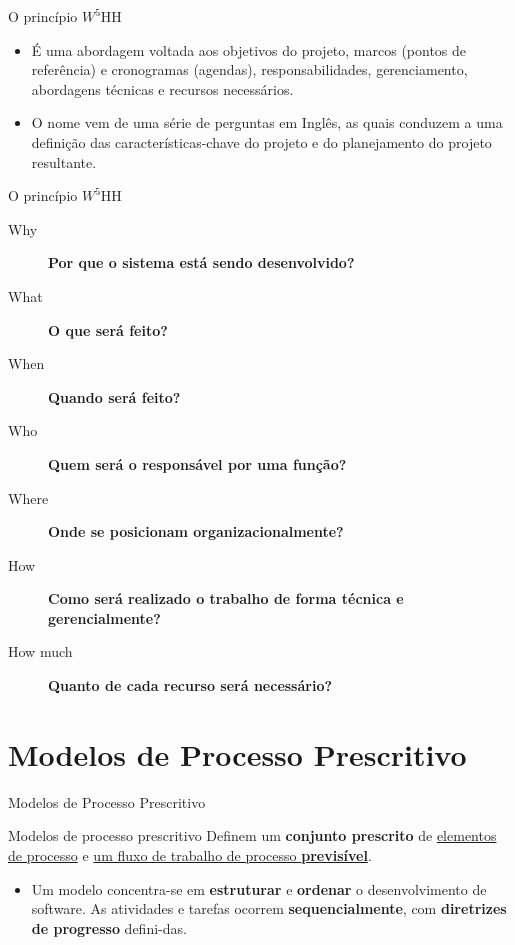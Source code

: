 \documentclass{beamer}
\begin{document}
\begin{frame}{O princípio $W^{5}$HH}
	\begin{itemize}
		\justifying
		\item É uma abordagem voltada aos objetivos do projeto, marcos (pontos de referência) e cronogramas (agendas), responsabilidades, gerenciamento, abordagens técnicas e recursos necessários.
		\item O nome vem de uma série de perguntas em Inglês, as quais conduzem a uma definição das características-chave do projeto e do planejamento do projeto resultante.
	\end{itemize}
\end{frame}

\begin{frame}{O princípio $W^{5}$HH}
	\begin{description}
		\item[Why] \textbf{Por que o sistema está sendo desenvolvido?}
		\item[What] \textbf{O que será feito?}
		\item[When] \textbf{Quando será feito?}
		\item[Who] \textbf{Quem será o responsável por uma função?}
		\item[Where] \textbf{Onde se posicionam organizacionalmente?}
		\item[How] \textbf{Como será realizado o trabalho de forma técnica e gerencialmente?}
		\item[How much] \textbf{Quanto de cada recurso será necessário?}
	\end{description}
\end{frame} 

\section{Modelos de Processo Prescritivo}

\begin{frame}{Modelos de Processo Prescritivo}
	\begin{block}{Modelos de processo prescritivo}
		\justifying
		Definem um \textbf{conjunto prescrito} de \underline{elementos de processo} e \underline{um fluxo de trabalho de processo \textbf{previsível}}.        
	\end{block}
	
	\begin{itemize}
		\justifying
		\item<2-> Um modelo concentra-se em \textbf{estruturar} e \textbf{ordenar} o desenvolvimento de software. As atividades e tarefas ocorrem \textbf{sequencialmente}, com \textbf{diretrizes de progresso} defini-das.
	\end{itemize}
\end{frame}
\end{document}
